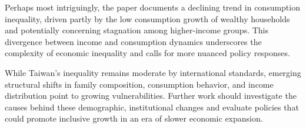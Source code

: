 \documentclass{article}
\begin{document}
Perhaps most intriguingly, the paper documents a declining trend in consumption inequality, driven partly by the low consumption growth of wealthy households and potentially concerning stagnation among higher-income groups. This divergence between income and consumption dynamics underscores the complexity of economic inequality and calls for more nuanced policy responses.

While Taiwan's inequality remains moderate by international standards, emerging structural shifts in family composition, consumption behavior, and income distribution point to growing vulnerabilities. Further work should investigate the causes behind these demographic, institutional changes and evaluate policies that could promote inclusive growth in an era of slower economic expansion.



\printbibliography
\end{document}
